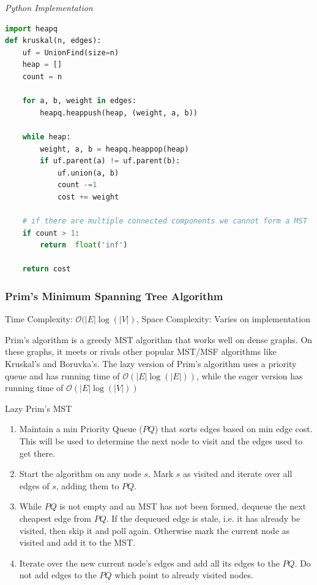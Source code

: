 \documentclass{article}
\newcommand{\bigO}{\mathcal{O}}
\begin{document}
\vspace{8pt} \emph{Python Implementation}
\begin{lstlisting}[language=Python]
import heapq
def kruskal(n, edges):
    uf = UnionFind(size=n)
    heap = []
    count = n
    
    for a, b, weight in edges:
        heapq.heappush(heap, (weight, a, b))
        
    while heap:
        weight, a, b = heapq.heappop(heap)
        if uf.parent(a) != uf.parent(b):
            uf.union(a, b)
            count -=1
            cost += weight
            
    # if there are multiple connected components we cannot form a MST
    if count > 1:
        return  float('inf')
    
    return cost
\end{lstlisting}
    
    \subsubsection{Prim's Minimum Spanning Tree Algorithm}
    Time Complexity:  $\bigO(|E|\log(|V|)$, Space Complexity: Varies on implementation
    
    Prim's algorithm is a greedy MST algorithm that works well on dense graphs. On these graphs, it meets or rivals other popular MST/MSF algorithms like Kruskal's and Boruvka's. The lazy version of Prim's algorithm uses a priority queue and has running time of $\bigO(|E| \log(|E|))$, while the eager version has running time of $\bigO(|E| \log(|V|))$ 
    
    Lazy Prim's MST
    \begin{enumerate}
        \item Maintain a min Priority Queue ($PQ$) that sorts edges based on min edge cost. This will be used to determine the next node to visit and the edges used to get there.
        
        \item Start the algorithm on any node $s$. Mark $s$ as visited and iterate over all edges of $s$, adding them to $PQ$.
        
        \item While $PQ$ is not empty and an MST has not been formed, dequeue the next cheapest edge from $PQ$. If the dequeued edge is stale, i.e. it has already be visited, then skip it and poll again. Otherwise mark the current node as visited and add it to the MST.
        
        \item Iterate over the new current node's edges and add all its edges to the $PQ$. Do not add edges to the $PQ$ which point to already visited nodes.
    \end{enumerate}
    
\end{document}
